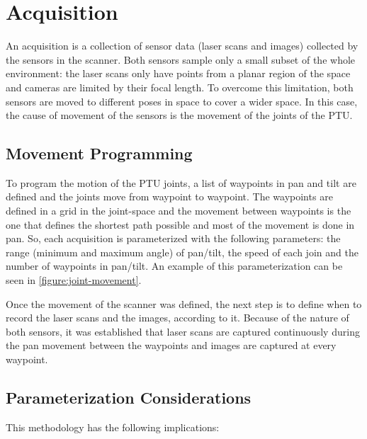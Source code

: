 \section{Acquisition}
\label{section:acquisition}

An acquisition is a collection of sensor data (laser scans and images) collected by the sensors in the scanner. Both sensors sample only a small subset of the whole environment: the laser scans only have points from a planar region of the space and cameras are limited by their focal length. To overcome this limitation, both sensors are moved to different poses in space to cover a wider space. In this case, the cause of movement of the sensors is the movement of the joints of the PTU. 

\subsection{Movement Programming}

To program the motion of the PTU joints, a list of waypoints in pan and tilt are defined and the joints move from waypoint to waypoint. The waypoints are defined in a grid in the joint-space and the movement between waypoints is the one that defines the shortest path possible and most of the movement is done in pan. So, each acquisition is parameterized with the following parameters: the range (minimum and maximum angle) of pan/tilt, the speed of each join and the number of waypoints in pan/tilt. An example of this parameterization can be seen in \cref{figure:joint-movement}.

Once the movement of the scanner was defined, the next step is to define when to record the laser scans and the images, according to it. Because of the nature of both sensors, it was established that laser scans are captured continuously during the pan movement between the waypoints and images are captured at every waypoint.



\subsection{Parameterization Considerations}

This methodology has the following implications:

